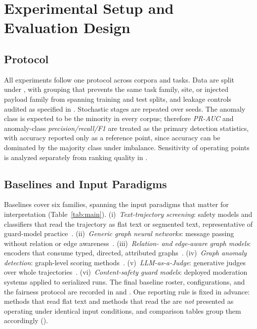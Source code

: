 \section{Experimental Setup and Evaluation Design}
\label{sec:experiments}

\subsection{Protocol}
All experiments follow one protocol across corpora and tasks. Data are split under , with grouping that prevents the same task family, site, or injected payload family from spanning training and test splits, and leakage controls audited as specified in . Stochastic stages are repeated over  seeds. The anomaly class is expected to be the minority in every corpus; therefore \emph{PR-AUC} and anomaly-class \emph{precision/recall/F1} are treated as the primary detection statistics, with accuracy reported only as a reference point, since accuracy can be dominated by the majority class under imbalance. Sensitivity of operating points is analyzed separately from ranking quality in .

\subsection{Baselines and Input Paradigms}
\label{sec:baselines}
Baselines cover six families, spanning the input paradigms that matter for interpretation (Table~\ref{tab:main}). (i)~\emph{Text-trajectory screening}: safety models and classifiers that read the trajectory as flat text or segmented text, representative of guard-model practice~\cite{inan2023llama,liu2024calibration}. (ii)~\emph{Generic graph neural networks}: message passing without relation or edge awareness~\cite{velikovi2017graph}. (iii)~\emph{Relation- and edge-aware graph models}: encoders that consume typed, directed, attributed graphs~\cite{schlichtkrull2017modeling,hu2020heterogeneous,brody2021attentive}. (iv)~\emph{Graph anomaly detection}: graph-level scoring methods~\cite{tang2022rethinking,liu2021anomaly,wang2026glass}. (v)~\emph{LLM-as-a-Judge}: generative judges over whole trajectories~\cite{zheng2023judging,yuan2024rjudge,zhuge2024agentasajudge}. (vi)~\emph{Content-safety guard models}: deployed moderation systems applied to serialized runs. The final baseline roster, configurations, and the fairness protocol are recorded in  and . One reporting rule is fixed in advance: methods that read flat text and methods that read the \stg{} are \emph{not} presented as operating under identical input conditions, and comparison tables group them accordingly ().

